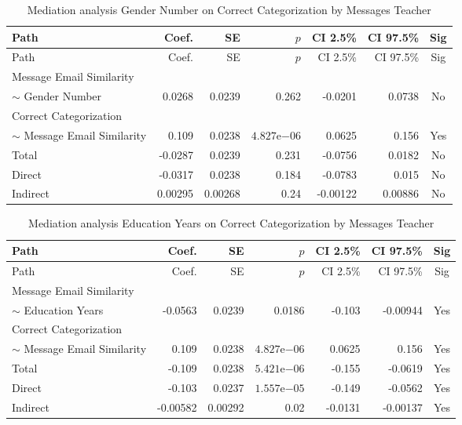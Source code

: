 \begin{longtable}{lrrrrrc}
            \caption{Mediation analysis Gender Number on Correct Categorization by  Messages Teacher}\label{tab:mediation Gender Number on Correct Categorization by  Messages Teacher}\\
            \toprule
            Path & Coef. & SE & $p$ & CI 2.5\% & CI 97.5\% & Sig \\
            \midrule
            \endfirsthead
            \toprule
            Path & Coef. & SE & $p$ & CI 2.5\% & CI 97.5\% & Sig \\
            \midrule
            \endhead
            \bottomrule
            \endfoot
            Message Email Similarity\\ $\sim$ Gender Number & 0.0268 & 0.0239 & 0.262 & -0.0201 & 0.0738 & No \\
Correct Categorization\\ $\sim$ Message Email Similarity & 0.109 & 0.0238 & $4.827\mathrm{e}{-06}$ & 0.0625 & 0.156 & Yes \\
Total & -0.0287 & 0.0239 & 0.231 & -0.0756 & 0.0182 & No \\
Direct & -0.0317 & 0.0238 & 0.184 & -0.0783 & 0.015 & No \\
Indirect & 0.00295 & 0.00268 & 0.24 & -0.00122 & 0.00886 & No \\
\end{longtable}

\begin{longtable}{lrrrrrc}
            \caption{Mediation analysis Education Years on Correct Categorization by  Messages Teacher}\label{tab:mediation Education Years on Correct Categorization by  Messages Teacher}\\
            \toprule
            Path & Coef. & SE & $p$ & CI 2.5\% & CI 97.5\% & Sig \\
            \midrule
            \endfirsthead
            \toprule
            Path & Coef. & SE & $p$ & CI 2.5\% & CI 97.5\% & Sig \\
            \midrule
            \endhead
            \bottomrule
            \endfoot
            Message Email Similarity\\ $\sim$ Education Years & -0.0563 & 0.0239 & 0.0186 & -0.103 & -0.00944 & Yes \\
Correct Categorization\\ $\sim$ Message Email Similarity & 0.109 & 0.0238 & $4.827\mathrm{e}{-06}$ & 0.0625 & 0.156 & Yes \\
Total & -0.109 & 0.0238 & $5.421\mathrm{e}{-06}$ & -0.155 & -0.0619 & Yes \\
Direct & -0.103 & 0.0237 & $1.557\mathrm{e}{-05}$ & -0.149 & -0.0562 & Yes \\
Indirect & -0.00582 & 0.00292 & 0.02 & -0.0131 & -0.00137 & Yes \\
\end{longtable}

